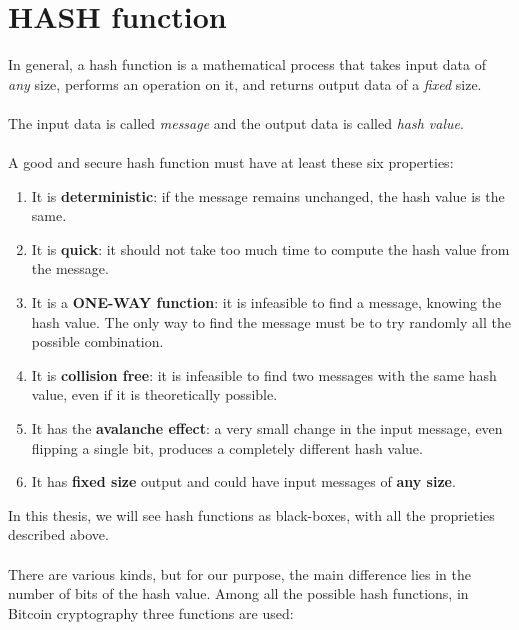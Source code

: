 \section{HASH function}
In general, a hash function is a mathematical process that takes input data of \textit{any} size, performs an operation on it, and returns output data of a \textit{fixed} size.
\\ \\
The input data is called \textit{message} and the output data is called \textit{hash value}. 
\\ \\
A good and secure hash function must have at least these six properties:
\begin{enumerate}[label=(\roman*)]
	\item It is \textbf{deterministic}: if the message remains unchanged, the hash value is the same.
	\item It is \textbf{quick}: it should not take too much time to compute the hash value from the message.
	\item It is a \textbf{ONE-WAY function}: it is infeasible to find a message, knowing the hash value. The only way to find the message must be to try randomly all the possible combination.
	\item It is \textbf{collision free}: it is infeasible to find two messages with the same hash value, even if it is theoretically possible.
	\item It has the \textbf{avalanche effect}: a very small change in the input message, even flipping a single bit, produces a completely different hash value.
	\item It has \textbf{fixed size} output and could have input messages of \textbf{any size}.
\end{enumerate}
In this thesis, we will see hash functions as black-boxes, with all the proprieties described above. 
\\ \\
There are various kinds, but for our purpose, the main difference lies in the number of bits of the hash value. Among all the possible hash functions, in Bitcoin cryptography three functions are used:
